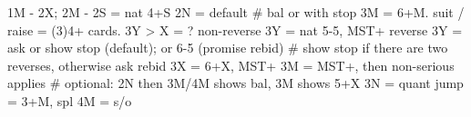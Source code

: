 1M - 2X; 2M -
2S = nat 4+S
2N = default  # bal or with stop
    3M = 6+M. suit / raise = (3)4+ cards. 3Y > X = ?
non-reverse 3Y = nat 5-5, MST+ 
reverse 3Y = ask or show stop (default); or 6-5 (promise rebid)
    # show stop if there are two reverses, otherwise ask
rebid 3X = 6+X, MST+
3M = MST+, then non-serious applies
    # optional: 2N then 3M/4M shows bal, 3M shows 5+X
3N = quant
jump = 3+M, spl
4M = s/o